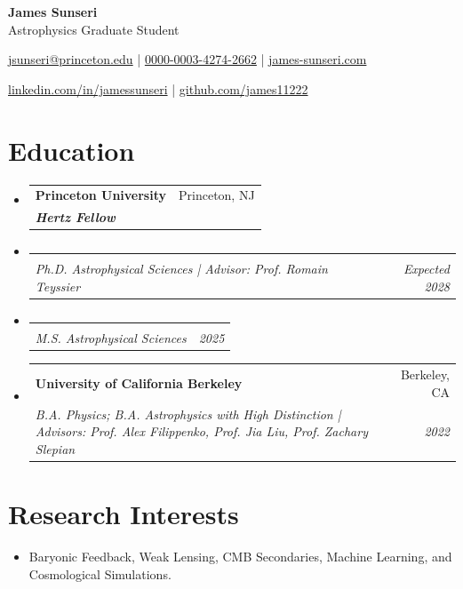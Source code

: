 \documentclass[letterpaper,10pt]{article}
\makeatletter
\newcommand{\resumeItemSimple}[2]{
  \item\small{
    \textbf{#1}{#2 \vspace{-3pt}}
  }
}
\newcommand{\resumeSubheading}[4]{
  \vspace{-1pt}\item[]
  \begin{tabular*}{0.98\textwidth}{l@{\extracolsep{\fill}}r}
      \hspace{-10pt}\textbf{#1} & #2 \\
      \hspace{-10pt}\textit{\small#3} & \textit{\small #4} \\
    \end{tabular*}\vspace{-3pt}
}
\newcommand{\resumeSubHeadingListStart}{\begin{itemize}[leftmargin=*]}
\newcommand{\resumeSubHeadingListEnd}{\end{itemize}}
\newcommand{\resumeItemListStart}{\begin{itemize}}
\newcommand{\shorterSection}[1]{\vspace{-10pt}\section{#1}}
\newcommand{\LinkedinLogo}{\textcolor{rgb:red,6;green,108;blue,170}{\faLinkedinSquare}}
\makeatother
\begin{document}
\begin{center}
  \textbf{\huge James Sunseri} \\ \vspace{0.07in} 
  {\Large Astrophysics Graduate Student} \\ \vspace{0.05in} 
  


  {\normalsize \faSendO \hspace{0pt} \href{href="mailto:jsunseri@princeton.edu"}{jsunseri@princeton.edu} | {\Large {}} \hspace{-2pt} \href{https://orcid.org/0000-0003-4274-2662/}{0000-0003-4274-2662} | \faUser \hspace{0 pt} \href{https://www.james-sunseri.com}{james-sunseri.com} \par \vspace{0.05in} \LinkedinLogo \hspace{0pt} \href{https://www.linkedin.com/in/jamessunseri}{linkedin.com/in/jamessunseri} | \faGithubSquare \hspace{0pt} \href{https://github.com/james11222}{github.com/james11222}}
\end{center}

\shorterSection{Education}
  \resumeSubHeadingListStart
    \resumeSubheading
      {Princeton University}{Princeton, NJ}
      {\textbf{Hertz Fellow}}{}{
    }
    \vspace{-20pt}
    \resumeSubheading
    {}{}{Ph.D. Astrophysical Sciences | Advisor: Prof. Romain Teyssier}{Expected 2028}{
    }
    \vspace{-20pt}
    \resumeSubheading
    {}{}{M.S. Astrophysical Sciences }{2025}{
    }
    \resumeSubheading
      {University of California Berkeley}{Berkeley, CA}
      {B.A. Physics; B.A. Astrophysics with High Distinction | Advisors: Prof. Alex Filippenko, Prof. Jia Liu, Prof. Zachary Slepian}{2022}{
    }

  \resumeSubHeadingListEnd
  
 
\shorterSection{Research Interests}

\resumeItemListStart
\resumeItemSimple{}{Baryonic Feedback, Weak Lensing, CMB Secondaries, Machine Learning, and Cosmological Simulations.}
\resumeSubHeadingListEnd
\end{document}
